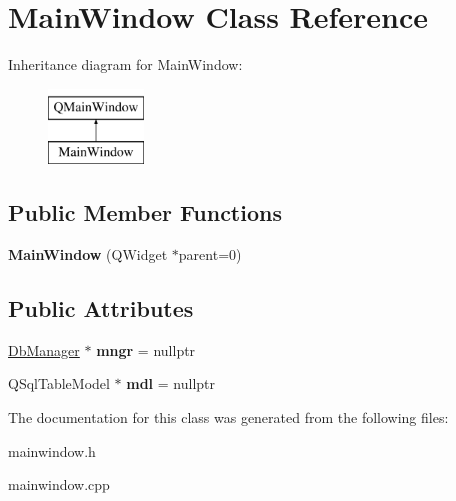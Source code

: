 \hypertarget{class_main_window}{}\section{Main\+Window Class Reference}
\label{class_main_window}
Inheritance diagram for Main\+Window\+:\begin{figure}[H]
\begin{center}
\leavevmode
\includegraphics[height=2.000000cm]{class_main_window}
\end{center}
\end{figure}
\subsection*{Public Member Functions}
\begin{DoxyCompactItemize}
\item 
\mbox{\label{class_main_window_a8b244be8b7b7db1b08de2a2acb9409db}} 
{\bfseries Main\+Window} (Q\+Widget $\ast$parent=0)
\end{DoxyCompactItemize}
\subsection*{Public Attributes}
\begin{DoxyCompactItemize}
\item 
\mbox{\label{class_main_window_a29a7d3c84689e952e3226a9d53d09cf4}} 
\mbox{\hyperlink{class_db_manager}{Db\+Manager}} $\ast$ {\bfseries mngr} = nullptr
\item 
\mbox{\label{class_main_window_a5556112edb83f621ccb8f53e067ec7a7}} 
Q\+Sql\+Table\+Model $\ast$ {\bfseries mdl} = nullptr
\end{DoxyCompactItemize}


The documentation for this class was generated from the following files\+:\begin{DoxyCompactItemize}
\item 
mainwindow.\+h\item 
mainwindow.\+cpp\end{DoxyCompactItemize}
